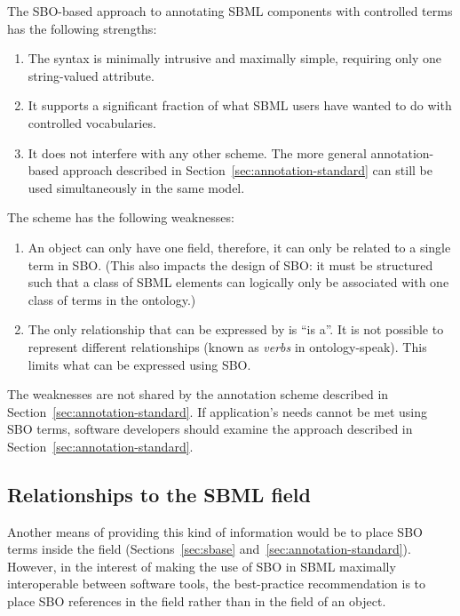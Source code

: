 The SBO-based approach to annotating SBML components with
controlled terms has the following strengths:
\begin{enumerate}

\item The syntax is minimally intrusive and maximally simple,
  requiring only one string-valued attribute.

\item It supports a significant fraction of what SBML users have wanted
  to do with controlled vocabularies.

\item It does not interfere with any other scheme.  The more
  general annotation-based approach described in
  Section~\ref{sec:annotation-standard} can still be used
  simultaneously in the same model.

\end{enumerate}

The scheme has the following weaknesses:
\begin{enumerate}

\item An object can only have one  field,
  therefore, it can only be related to a single term in SBO.
  (This also impacts the design of SBO: it must be structured such
  that a class of SBML elements can logically only be associated
  with one class of terms in the ontology.)

\item The only relationship that can be expressed by
   is ``is a''.  It is not possible to represent
  different relationships (known as \emph{verbs} in
  ontology-speak).  This limits what can be expressed using SBO.

\end{enumerate}

The weaknesses are not shared by the annotation scheme described
in Section~\ref{sec:annotation-standard}.  If application's
needs cannot be met using SBO terms, software developers should
examine the approach described in
Section~\ref{sec:annotation-standard}.

\subsection{Relationships to the SBML  field}

Another means of providing this kind of information would be to
place SBO terms inside the  field
(Sections~\ref{sec:sbase} and~\ref{sec:annotation-standard}).  However, in the interest of making the
use of SBO in SBML maximally interoperable between software tools,
the best-practice recommendation is to place SBO references in the
 field rather than in the  field
of an object.

